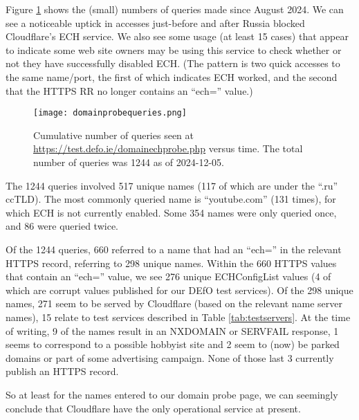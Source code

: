 Figure \ref{fig:qtimes} shows the (small) numbers of queries made since August
2024. We can see a noticeable uptick in accesses just-before and after Russia
blocked Cloudflare's ECH service. We also see some usage (at least 15 cases) that
appear to indicate some web site owners may be using this service to check
whether or not they have successfully disabled ECH. (The pattern is two quick
accesses to the same name/port, the first of which indicates ECH worked, and
the second that the HTTPS RR no longer contains an ``ech='' value.)

\begin{figure}
	\centering
	\texttt{[image: domainprobequeries.png]}
		\caption[clustediag]{Cumulative number of queries seen at 
        \url{https://test.defo.ie/domainechprobe.php} versus time. 
        The total number of queries was 1244 as of 2024-12-05.} 
	\label{fig:qtimes}
\end{figure}

The 1244 queries involved 517 unique names (117 of which are under
the ``.ru'' ccTLD). The most commonly queried name is ``youtube.com'' (131 times),
for which ECH is not currently enabled. Some 354 names were only queried 
once, and 86 were queried twice.

Of the 1244 queries, 660 referred to a name that had an ``ech='' in
the relevant HTTPS record, referring to 298 unique names.  Within the 660 HTTPS 
values that contain an ``ech='' value, we see 276 unique ECHConfigList values (4 of which are
corrupt values published for our DEfO test services).  Of the 298 unique
names, 271 seem to be served by Cloudflare (based on the relevant name server
names), 15 relate to test services described in Table \ref{tab:testservers}. At
the time of writing, 9 of the names result in an NXDOMAIN or SERVFAIL
response, 1 seems to correspond to a possible hobbyist site and 2 seem to (now)
be parked domains or part of some advertising campaign. None of those last
3 currently publish an HTTPS record.

So at least for the names entered to our domain probe page, we can seemingly
conclude that Cloudflare have the only operational service at present.
